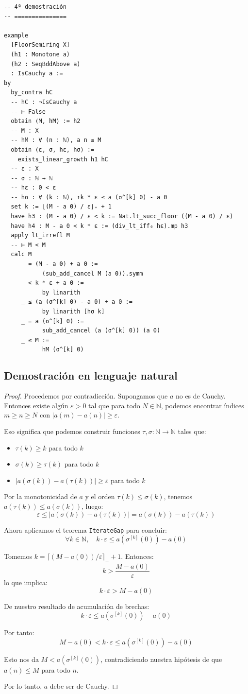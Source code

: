 \begin{verbatim}
-- 4ª demostración
-- ===============

example
  [FloorSemiring X]
  (h1 : Monotone a)
  (h2 : SeqBddAbove a)
  : IsCauchy a :=
by
  by_contra hC
  -- hC : ¬IsCauchy a
  -- ⊢ False
  obtain ⟨M, hM⟩ := h2
  -- M : X
  -- hM : ∀ (n : ℕ), a n ≤ M
  obtain ⟨ε, σ, hε, hσ⟩ :=
    exists_linear_growth h1 hC
  -- ε : X
  -- σ : ℕ → ℕ
  -- hε : 0 < ε
  -- hσ : ∀ (k : ℕ), ↑k * ε ≤ a (σ^[k] 0) - a 0
  set k := ⌊(M - a 0) / ε⌋₊ + 1
  have h3 : (M - a 0) / ε < k := Nat.lt_succ_floor ((M - a 0) / ε)
  have h4 : M - a 0 < k * ε := (div_lt_iff₀ hε).mp h3
  apply lt_irrefl M
  -- ⊢ M < M
  calc M
       = (M - a 0) + a 0 :=
           (sub_add_cancel M (a 0)).symm
     _ < k * ε + a 0 :=
           by linarith
     _ ≤ (a (σ^[k] 0) - a 0) + a 0 :=
           by linarith [hσ k]
     _ = a (σ^[k] 0) :=
           sub_add_cancel (a (σ^[k] 0)) (a 0)
     _ ≤ M :=
           hM (σ^[k] 0)
\end{verbatim}

\subsection{Demostración en lenguaje natural}

\begin{proof}
Procedemos por contradicción. Supongamos que $a$ no es de Cauchy. Entonces
existe algún $\varepsilon > 0$ tal que para todo $N \in \mathbb{N}$,
podemos encontrar índices $m \geq n \geq N$ con
$|a(m) - a(n)| \geq \varepsilon$.

Eso significa que podemos construir funciones $\tau, \sigma : \mathbb{N}
\to \mathbb{N}$ tales que:
\begin{itemize}[nosep]
  \item $\tau(k) \geq k$ para todo $k$
  \item $\sigma(k) \geq \tau(k)$ para todo $k$
  \item $|a(\sigma(k)) - a(\tau(k))| \geq \varepsilon$ para todo $k$
\end{itemize}

Por la monotonicidad de $a$ y el orden $\tau(k) \leq \sigma(k)$, tenemos
$a(\tau(k)) \leq a(\sigma(k))$, luego:
\[
  \varepsilon \leq |a(\sigma(k)) - a(\tau(k))| = a(\sigma(k)) - a(\tau(k))
\]

Ahora aplicamos el teorema \texttt{IterateGap} para concluir:
\[
  \forall k \in \mathbb{N},\quad k \cdot \varepsilon \leq a(\sigma^{[k]}(0)) - a(0)
\]

Tomemos $k = \lceil(M - a(0))/\varepsilon\rceil_+ + 1$. Entonces:
\[
  k > \frac{M - a(0)}{\varepsilon}
\]
lo que implica:
\[
  k \cdot \varepsilon > M - a(0)
\]

De nuestro resultado de acumulación de brechas:
\[
  k \cdot \varepsilon \leq a(\sigma^{[k]}(0)) - a(0)
\]

Por tanto:
\[
  M - a(0) < k \cdot \varepsilon \leq a(\sigma^{[k]}(0)) - a(0)
\]

Esto nos da $M < a(\sigma^{[k]}(0))$, contradiciendo nuestra hipótesis de
que $a(n) \leq M$ para todo $n$.

Por lo tanto, $a$ debe ser de Cauchy.
\end{proof}

